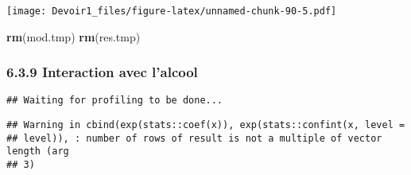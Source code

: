 \documentclass[]{article}
\newenvironment{Shaded}{\begin{snugshade}}{\end{snugshade}}
\newcommand{\KeywordTok}[1]{\textcolor[rgb]{0.13,0.29,0.53}{\textbf{#1}}}
\newcommand{\DataTypeTok}[1]{\textcolor[rgb]{0.13,0.29,0.53}{#1}}
\newcommand{\DecValTok}[1]{\textcolor[rgb]{0.00,0.00,0.81}{#1}}
\newcommand{\StringTok}[1]{\textcolor[rgb]{0.31,0.60,0.02}{#1}}
\newcommand{\OperatorTok}[1]{\textcolor[rgb]{0.81,0.36,0.00}{\textbf{#1}}}
\newcommand{\NormalTok}[1]{#1}
\begin{document}
\texttt{[image: Devoir1\_files/figure-latex/unnamed-chunk-90-5.pdf]}

\begin{Shaded}
\begin{Highlighting}[]
\KeywordTok{rm}\NormalTok{(mod.tmp)}
\KeywordTok{rm}\NormalTok{(res.tmp)}
\end{Highlighting}
\end{Shaded}

\subsubsection{6.3.9 Interaction avec
l'alcool}\label{interaction-avec-lalcool}

\begin{Shaded}
\end{Shaded}

\begin{verbatim}
## Waiting for profiling to be done...
\end{verbatim}

\begin{verbatim}
## Warning in cbind(exp(stats::coef(x)), exp(stats::confint(x, level =
## level)), : number of rows of result is not a multiple of vector length (arg
## 3)
\end{verbatim}
\end{document}
